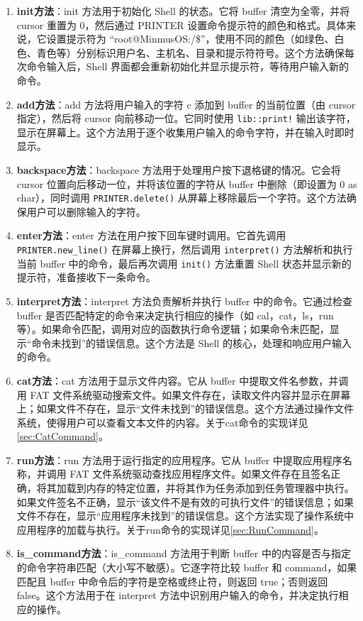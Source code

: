 \begin{enumerate}
    \item \textbf{init方法}：init 方法用于初始化 Shell 的状态。它将 buffer 清空为全零，并将 cursor 重置为 0，然后通过 PRINTER 设置命令提示符的颜色和格式。具体来说，它设置提示符为 “root@MinmusOS:/\$”，使用不同的颜色（如绿色、白色、青色等）分别标识用户名、主机名、目录和提示符符号。这个方法确保每次命令输入后，Shell 界面都会重新初始化并显示提示符，等待用户输入新的命令。
    \item \textbf{add方法}：add 方法将用户输入的字符 c 添加到 buffer 的当前位置（由 cursor 指定），然后将 cursor 向前移动一位。它同时使用 \texttt{lib::print!} 输出该字符，显示在屏幕上。这个方法用于逐个收集用户输入的命令字符，并在输入时即时显示。
    \item \textbf{backspace方法}：backspace 方法用于处理用户按下退格键的情况。它会将 cursor 位置向后移动一位，并将该位置的字符从 buffer 中删除（即设置为 0 as char），同时调用 \texttt{PRINTER.delete()} 从屏幕上移除最后一个字符。这个方法确保用户可以删除输入的字符。
    \item \textbf{enter方法}：enter 方法在用户按下回车键时调用。它首先调用 \texttt{PRINTER.new\_line()} 在屏幕上换行，然后调用 \texttt{interpret()} 方法解析和执行当前 buffer 中的命令，最后再次调用 \texttt{init()} 方法重置 Shell 状态并显示新的提示符，准备接收下一条命令。
    \item \textbf{interpret方法}：interpret 方法负责解析并执行 buffer 中的命令。它通过检查 buffer 是否匹配特定的命令来决定执行相应的操作（如 cal，cat，ls，run 等）。如果命令匹配，调用对应的函数执行命令逻辑；如果命令未匹配，显示“命令未找到”的错误信息。这个方法是 Shell 的核心，处理和响应用户输入的命令。
    \item \textbf{cat方法}：cat 方法用于显示文件内容。它从 buffer 中提取文件名参数，并调用 FAT 文件系统驱动搜索文件。如果文件存在，读取文件内容并显示在屏幕上；如果文件不存在，显示“文件未找到”的错误信息。这个方法通过操作文件系统，使得用户可以查看文本文件的内容。关于cat命令的实现详见\cref{sec:CatCommand}。
    \item \textbf{run方法}：run 方法用于运行指定的应用程序。它从 buffer 中提取应用程序名称，并调用 FAT 文件系统驱动查找应用程序文件。如果文件存在且签名正确，将其加载到内存的特定位置，并将其作为任务添加到任务管理器中执行。如果文件签名不正确，显示“该文件不是有效的可执行文件”的错误信息；如果文件不存在，显示“应用程序未找到”的错误信息。这个方法实现了操作系统中应用程序的加载与执行。关于run命令的实现详见\cref{sec:RunCommand}。
    \item \textbf{is\_command方法}：is\_command 方法用于判断 buffer 中的内容是否与指定的命令字符串匹配（大小写不敏感）。它逐字符比较 buffer 和 command，如果匹配且 buffer 中命令后的字符是空格或终止符，则返回 true；否则返回 false。这个方法用于在 interpret 方法中识别用户输入的命令，并决定执行相应的操作。
\end{enumerate}

